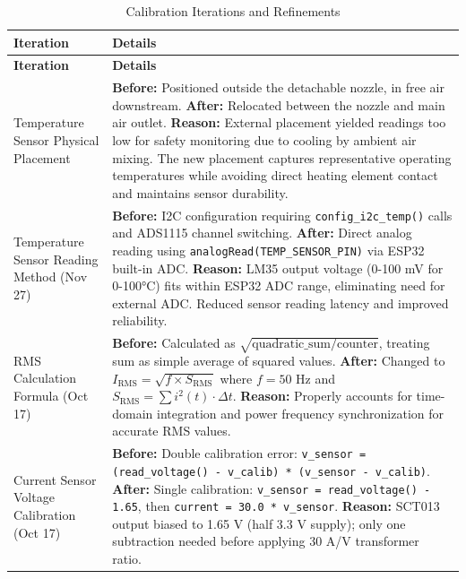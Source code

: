 \documentclass[11pt,a4paper]{article}
\begin{document}
\begin{longtable}{|p{}|p{}|}
\caption{Calibration Iterations and Refinements}
\label{tab:calibration_iterations} \\
\hline
\textbf{Iteration} & \textbf{Details} \\
\hline
\endfirsthead
\hline
\textbf{Iteration} & \textbf{Details} \\
\hline
\endhead
\hline
\endfoot
\hline
\endlastfoot
Temperature Sensor Physical Placement & \textbf{Before:} Positioned outside the detachable nozzle, in free air downstream. \newline \textbf{After:} Relocated between the nozzle and main air outlet. \newline \textbf{Reason:} External placement yielded readings too low for safety monitoring due to cooling by ambient air mixing. The new placement captures representative operating temperatures while avoiding direct heating element contact and maintains sensor durability. \\
\hline
Temperature Sensor Reading Method (Nov 27) & \textbf{Before:} I2C configuration requiring \texttt{config\_i2c\_temp()} calls and ADS1115 channel switching. \newline \textbf{After:} Direct analog reading using \texttt{analogRead(TEMP\_SENSOR\_PIN)} via ESP32 built-in ADC. \newline \textbf{Reason:} LM35 output voltage (0-100 mV for 0-100°C) fits within ESP32 ADC range, eliminating need for external ADC. Reduced sensor reading latency and improved reliability. \\
\hline
RMS Calculation Formula (Oct 17) & \textbf{Before:} Calculated as $\sqrt{\text{quadratic\_sum} / \text{counter}}$, treating sum as simple average of squared values. \newline \textbf{After:} Changed to $I_{\text{RMS}} = \sqrt{f \times S_{\text{RMS}}}$ where $f = 50$ Hz and $S_{\text{RMS}} = \sum i^2(t) \cdot \Delta t$. \newline \textbf{Reason:} Properly accounts for time-domain integration and power frequency synchronization for accurate RMS values. \\
\hline
Current Sensor Voltage Calibration (Oct 17) & \textbf{Before:} Double calibration error: \texttt{v\_sensor = (read\_voltage() - v\_calib) * (v\_sensor - v\_calib)}. \newline \textbf{After:} Single calibration: \texttt{v\_sensor = read\_voltage() - 1.65}, then \texttt{current = 30.0 * v\_sensor}. \newline \textbf{Reason:} SCT013 output biased to 1.65 V (half 3.3 V supply); only one subtraction needed before applying 30 A/V transformer ratio. \\

\end{longtable}
\end{document}
